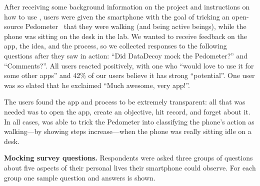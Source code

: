After receiving some background information on the project and instructions
on how to use \PocketMocker{}, users were given the smartphone with the goal
of tricking an open-source Pedometer~\cite{pedometer-playstore-url} that they
were walking (and being active beings), while the phone was sitting on the
desk in the lab. We wanted to receive feedback on the app, the idea,
and the process, so we collected responses to the following questions after
they saw \PocketMocker{} in action: ``Did DataDecoy mock the Pedometer?'' and
``Comments?''. All users reacted positively, with one who ``would love to use
it for some other apps'' and 42\% of our users believe it has strong
``potential''. One user was so elated that he exclaimed ``Much awesome, very
app!''.

The users found the app and process to be extremely transparent: all
that was needed was to open the app, create an objective, hit record, and
forget about it. In all cases, \PocketMocker{} was able to trick the
Pedometer into classifying the phone's action as walking---by showing steps
increase---when the phone was really sitting idle on a desk.

\begin{table}[t]



\caption{\textbf{Mocking survey questions.} Respondents were asked three
groups of questions about five aspects of their personal lives their
smartphone could observe. For each group one sample question and answers is
shown.}

  \label{table-surveyquestions}
\end{table}
